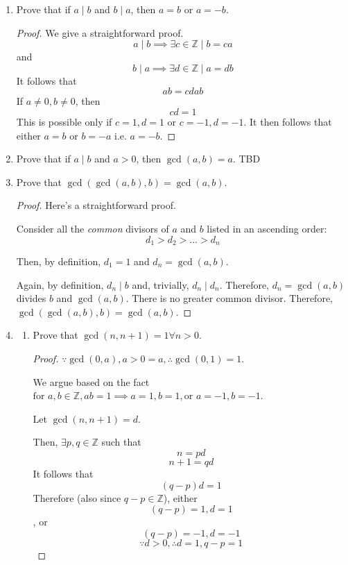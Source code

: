 \documentclass[english,notitlepage,smartquotes]{hgbreport}
\theoremstyle{definition}
\theoremstyle{remark}
\theoremstyle{plain}
\newtheorem{reflection}{Reflection}
\begin{document}
\begin{enumerate}[label=\textbf{\arabic*}.]
\begin{reflection}
Perhaps we did.

We cannot escape a feeling that we are close to a useful generalization, a slice of a theory! We will carry that positive feeling along but curb our enthusiasm.
\end{reflection}
\item Prove that if $a\mid b$ and $b\mid a$, then $a=b$ or $a=-b$.
\label{pr:17}
\begin{proof}
We give a straightforward proof.
$$
a\mid b\implies \exists c\in\mathbb{Z}\mid b=ca 
$$
and
$$
b\mid a\implies \exists d\in\mathbb{Z}\mid a=db 
$$
It follows that
$$
ab=cdab
$$
If $a\ne0,b\ne0$, then 
$$
cd=1
$$
This is possible only if $c=1,d=1$ or $c=-1,d=-1$. It then follows that either $a=b$ or $b=-a$ i.e. $a=-b$.
\end{proof}

\item Prove that if $a\mid b$ and $a>0$, then $\gcd(a,b)=a$.
\label{pr:18}
TBD

\item Prove that $\gcd(\gcd(a,b),b)=\gcd(a,b)$.
\label{pr:19}
\begin{proof}
Here's a straightforward proof.

Consider all the \emph{common} divisors of $a$ and $b$ listed in an ascending order: 
$$
d_1>d_2>\dots>d_n
$$

Then, by definition, $d_1=1$ and $d_n=\gcd(a,b)$.

Again, by definition, $d_n\mid b$ and, trivially, $d_n\mid d_n$. Therefore, $d_n=\gcd(a,b)$ divides $b$ and $\gcd(a,b)$. There is no greater common divisor. Therefore, $\gcd(\gcd(a,b),b)=\gcd(a,b)$.

\end{proof}
\item
\begin{enumerate}
\item Prove that $\gcd(n,n+1)=1\forall n>0$.
\label{pr:110a}
\begin{proof}
$\because\gcd(0,a),a>0=a,\therefore\gcd(0,1)=1$.

We argue based on the fact $\text{for } a,b\in\mathbb{Z}, ab=1\implies a=1,b=1, \text{or } a=-1,b=-1$.

Let $\gcd(n,n+1)=d$.

Then, $\exists p,q\in\mathbb{Z}$ such that
$$
n=pd
$$
$$
n+1=qd
$$
It follows that
$$
(q-p)d=1
$$
Therefore (also since $q-p\in\mathbb{Z}$), either
$$
(q-p)=1,d=1
$$
, or
$$
(q-p)=-1,d=-1
$$
$$
\because d>0, \therefore d=1,q-p=1
$$


\end{proof}
\end{enumerate}
\end{enumerate}
\end{document}

